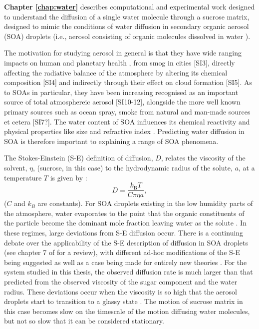 \textbf{Chapter \ref{chap:water}} describes computational and experimental work designed to understand the diffusion of a single water molecule through a sucrose matrix, designed to mimic the conditions of water diffusion in secondary organic aerosol (SOA) droplets  \cite{songTransientCavityDynamics2020a} (i.e., aerosol consisting of organic molecules dissolved in water \cite[chapter 1]{stepheningramCausesMagnitudesAtmospheric2019}). 

The motivation for studying aerosol in general is that they have wide ranging impacts on human and planetary health \cite{Ingram2017}, from smog in cities [SI3], directly affecting the radiative balance of the atmosphere by altering its chemical composition [SI4] and indirectly through their effect on cloud formation [SI5]. As to SOAs in particular, they have been increasing recognised as an important source of total atmosphereic aerosol [SI10-12], alongside the more well known primary sources such as ocean spray, smoke from natural and man-made sources et cetera [SI7?]. The water content of SOA influences its chemical reactivity \cite{varutbangkulHygroscopicitySecondaryOrganic2006} and physical properties like size and refractive index \cite{steimerElectrodynamicBalanceMeasurements2015,tangSimultaneousDeterminationRefractive1991}. Predicting water diffusion in SOA is therefore important to explaining a range of SOA phenomena. 

The Stokes-Einstein (S-E) definition of diffusion, $D$, relates the viscosity of the solvent, $\eta$, (sucrose, in this case) to the hydrodynamic radius of the solute, $a$, at a temperature $T$ is given by \cite[chapter  17]{dill2010molecular}:
\begin{equation}\label{eqn:diffusion_intro}
D=\frac{k_{\mathrm{B}} T}{C \pi \eta a},
\end{equation}
($C$ and $k_{B}$ are constants).  For SOA droplets existing in the low humidity parts of the atmosphere, water evaporates to the point that the organic constituents of the particle become the dominant mole fraction leaving water as the solute \cite{powerTransitionLiquidSolidlike2013, Price2014, Molinero2005}. In these regimes, large deviations from S-E diffusion occur\cite{powerTransitionLiquidSolidlike2013,Price2015,Chenyakin2017}. There is a continuing debate over the applicability of the S-E description of diffusion in SOA droplets (see chapter 7 of \cite{Ingram2017} for a review), with different ad-hoc modifications of the S-E being suggested\cite{Harris2009,price2016sucrose, Fernandez-Alonso2007} as well as a case being made for entirely new theories \cite{saltzmanActivatedHoppingDynamical2006}. For the system studied in this thesis, the observed diffusion rate is much larger than that predicted from the observed viscosity of the sugar component and the water radius. These deviations occur when the viscosity is so high that the aerosol droplets start to transition to a glassy state \cite{Bones2012}. The motion of sucrose matrix in this case becomes slow on the timescale of the motion diffusing water molecules, but not so slow that it can be considered stationary. 

